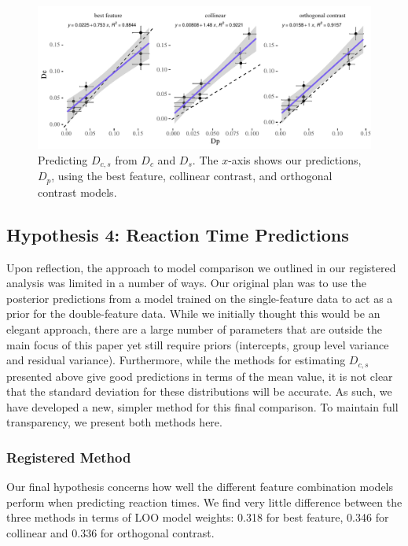 \documentclass[preprint,12pt,authoryear]{elsarticle}
\begin{document}
\begin{figure}[ht]
\centering
\includegraphics[width=\textwidth]{../plots/Dpe.pdf}
\caption{Predicting $D_{c,s}$ from $D_c$ and $D_s$. The $x$-axis shows our predictions, $D_p$, using the best feature, collinear contrast, and orthogonal contrast models.}
\label{fig:new:Dpe}
\end{figure}

\subsection{Hypothesis 4: Reaction Time Predictions}

Upon reflection, the approach to model comparison we outlined in our registered analysis was limited in a number of ways. Our original plan was to use the posterior predictions from a model trained on the single-feature data to act as a prior for the double-feature data. While we initially thought this would be an elegant approach, there are a large number of parameters that are outside the main focus of this paper yet still require priors (intercepts, group level variance and residual variance). Furthermore, while the methods for estimating $D_{c,s}$ presented above give good predictions in terms of the mean value, it is not clear that the standard deviation for these distributions will be accurate. As such, we have developed a new, simpler method for this final comparison. To maintain full transparency, we present both methods here. 

\subsubsection{Registered Method}

Our final hypothesis concerns how well the different feature combination models perform when predicting reaction times. We find very little difference between the three methods in terms of LOO model weights: 0.318 for best feature, 0.346 for collinear and 0.336 for orthogonal contrast. 
\end{document}
